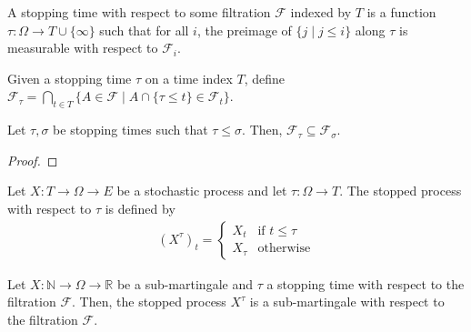 \begin{definition}\label{def:IsStoppingTime}
  \mathlibok
A stopping time with respect to some filtration $\mathcal{F}$ indexed by $T$ is a function $\tau : \Omega \to T \cup \{\infty\}$ such that for all $i$, the preimage of $\{j \mid j \le i\}$ along $\tau$ is measurable with respect to $\mathcal{F}_i$.
\end{definition}


\begin{definition}\label{def:StoppingTimeGen}
  \mathlibok
  Given a stopping time $\tau$ on a time index $T$, define
  $\mathcal{F}_\tau = \bigcap_{t \in T} \{A \in \mathcal{F} \mid A \cap \{\tau \le t\} \in \mathcal{F}_t\}.$
\end{definition}


\begin{lemma}\label{lem:StoppingTimeGenMono}
  \mathlibok
  Let $\tau, \sigma$ be stopping times such that $\tau \le \sigma$.
  Then, $\mathcal{F}_\tau \subseteq \mathcal{F}_\sigma$.
\end{lemma}

\begin{proof}\leanok

\end{proof}


\begin{definition}\label{def:stoppedProcess}
  \mathlibok
Let $X : T \to \Omega \to E$ be a stochastic process and let $\tau : \Omega \to T$.
The stopped process with respect to $\tau$ is defined by
\begin{align*}
  (X^{\tau})_t = \begin{cases}
    X_t & \text{if } t \le \tau \\
    X_{\tau} & \text{otherwise}
  \end{cases}
\end{align*}
\end{definition}


\begin{lemma}\label{lem:Submartingale.stoppedProcess}
  \mathlibok
Let $X : \mathbb{N} \to \Omega \to \mathbb{R}$ be a sub-martingale and $\tau$ a stopping time with respect to the filtration $\mathcal{F}$.
Then, the stopped process $X^{\tau}$ is a sub-martingale with respect to the filtration $\mathcal{F}$.
\end{lemma}

